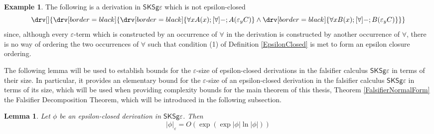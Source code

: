 \documentclass[10pt]{article}
\newtheorem{lemma}[theorem]{Lemma}
\theoremstyle{definition}\newtheorem{remark}[theorem]{Remark}
\theoremstyle{definition}\newtheorem{example}[theorem]{Example}
\theoremstyle{definition}\newtheorem{definition}[theorem]{Definition}
\newcommand{\FalsifierCalculus}{{\mathsf{SKSg\varepsilon}}}
\begin{document}
	\begin{example}
		The following is a derivation in $\FalsifierCalculus$ which is not epsilon-closed
		\[
			\drv[] {
				\drv[border=black] {
					\drv[border=black] {
						\forall x A(x) ; [\forall]- ; A(\varepsilon_y C)
					} \land \drv[border=black] {
						\forall x B(x) ; [\forall]- ; B(\varepsilon_y C)
					}
				}
			}
		\]
		since, although every $\varepsilon$-term which is constructed by an occurrence of $\forall$ in the derivation is constructed by another occurrence of $\forall$, there is no way of ordering the two occurrences of $\forall$ such that condition (1) of Definition \ref{EpsilonClosed} is met to form an epsilon closure ordering.
	\end{example}
	
	The following lemma will be used to establish bounds for the $\varepsilon$-size of epsilon-closed derivations in the falsifier calculus $\FalsifierCalculus$ in terms of their size. In particular, it provides an elementary bound for the $\varepsilon$-size of an epsilon-closed derivation in the falsifier calculus $\FalsifierCalculus$ in terms of its size, which will be used when providing complexity bounds for the main theorem of this thesis, Theorem \ref{FalsifierNormalForm} the Falsifier Decomposition Theorem, which will be introduced in the following subsection.
	
	\begin{lemma}\label{EpsilonSizeLemma}
		Let $\phi$ be an epsilon-closed derivation in $\FalsifierCalculus$. Then
		\[
			| \phi |_\varepsilon = O (\exp (\exp | \phi | \ln | \phi |))
		\]
	\end{lemma}
	
\end{document}

